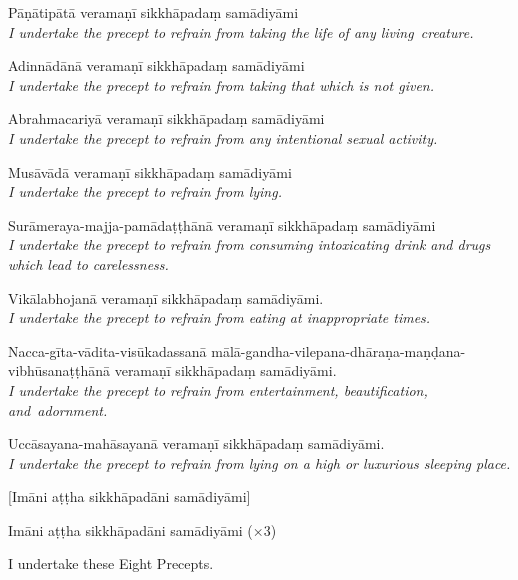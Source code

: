 {\raggedright

\begin{packedenumerate}
  \item Pāṇātipātā veramaṇī sikkhāpadaṃ samādiyāmi\\
  \emph{I undertake the precept to refrain from taking the life of any living~creature.}
  \item Adinnādānā veramaṇī sikkhāpadaṃ samādiyāmi\\
  \emph{I undertake the precept to refrain from taking that which is not given.}
  \item Abrahmacariyā veramaṇī sikkhāpadaṃ samādiyāmi\\
  \emph{I undertake the precept to refrain from any intentional sexual activity.}
  \item Musāvādā veramaṇī sikkhāpadaṃ samādiyāmi\\
  \emph{I undertake the precept to refrain from lying.}
  \item Surāmeraya-majja-pamādaṭṭhānā veramaṇī sikkhāpadaṃ samādiyāmi\\
  \emph{I undertake the precept to refrain from consuming intoxicating drink and drugs which lead to carelessness.}
  \item Vikālabhojanā veramaṇī sikkhāpadaṃ samādiyāmi.\\
  \emph{I undertake the precept to refrain from eating at inappropriate times.}
  \item Nacca-gīta-vādita-visūkadassanā mālā-gandha-vilepana-dhāraṇa-maṇḍana-vibhūsanaṭṭhānā veramaṇī sikkhāpadaṃ samādiyāmi.\\
  \emph{I undertake the precept to refrain from entertainment, beautification, and~adornment.}
  \item Uccāsayana-mahāsayanā veramaṇī sikkhāpadaṃ samādiyāmi.\\
  \emph{I undertake the precept to refrain from lying on a high or luxurious sleeping place.}
\end{packedenumerate}

}



[Imāni aṭṭha sikkhāpadāni samādiyāmi]


Imāni aṭṭha sikkhāpadāni samādiyāmi (×3)

\begin{english}
  I undertake these Eight Precepts.
\end{english}

